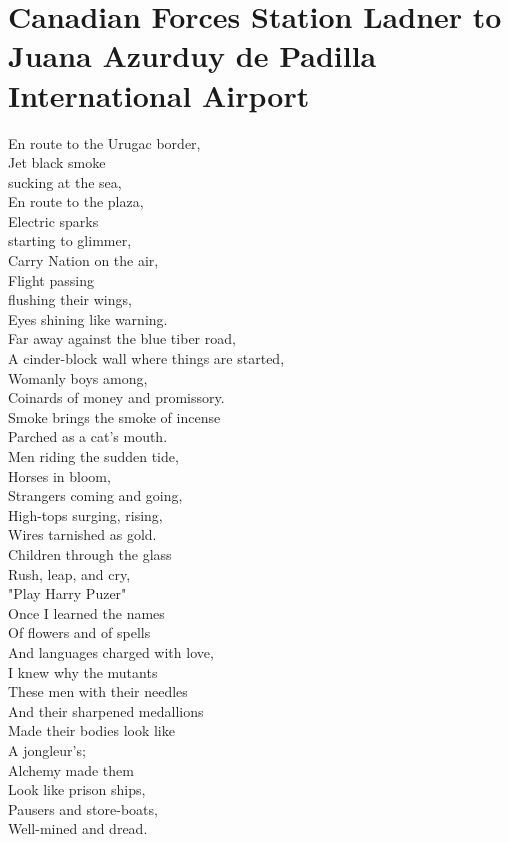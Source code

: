 \documentclass[smalldemyvopaper,11pt,twoside,onecolumn,openright,extrafontsizes]{memoir}
\begin{document}
\chapter{Canadian Forces Station Ladner to Juana Azurduy de Padilla International Airport}
En route to the Urugac border,
\\Jet black smoke
\\sucking at the sea,
\\En route to the plaza,
\\Electric sparks
\\starting to glimmer,
\\Carry Nation on the air,
\\Flight passing
\\flushing their wings,
\\Eyes shining like warning.
\\Far away against the blue tiber road,
\\A cinder-block wall where things are started,
\\Womanly boys among,
\\Coinards of money and promissory.
\\Smoke brings the smoke of incense
\\Parched as a cat's mouth.
\\Men riding the sudden tide,
\\Horses in bloom,
\\Strangers coming and going,
\\High-tops surging, rising,
\\Wires tarnished as gold.
\\Children through the glass
\\Rush, leap, and cry,
\\"Play Harry Puzer"
\\Once I learned the names
\\Of flowers and of spells
\\And languages charged with love,
\\I knew why the mutants
\\These men with their needles
\\And their sharpened medallions
\\Made their bodies look like
\\A jongleur's;
\\Alchemy made them
\\Look like prison ships,
\\Pausers and store-boats,
\\Well-mined and dread.
\end{document}
